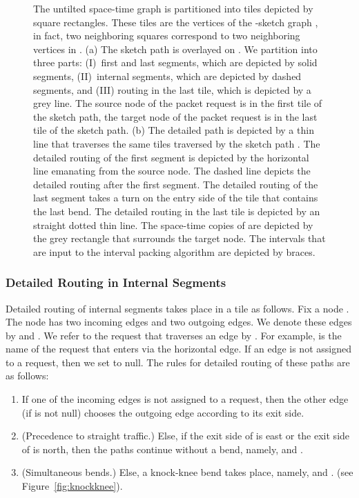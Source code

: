 \documentclass[11pt]{article}
\newenvironment{proof sketch}[1]{\noindent {\emph{Proof sketch of #1:}}}{\hfill \qed}
\begin{document}
\begin{figure}
  \centering
  \qquad
  \caption{The untilted space-time graph  is partitioned into tiles depicted by square rectangles. These tiles are the vertices of the -sketch graph , in fact, two neighboring squares correspond to two neighboring vertices in . (a) The sketch path  is overlayed on . We partition  into three parts: (I)~first and last segments, which are depicted by solid segments, (II)~internal segments, which are depicted by dashed segments, and (III) routing in the last tile, which is depicted by a grey line. The source node of the packet request is in the first tile of the sketch path, the target node of the packet request is in the last tile of the sketch path. (b) The detailed path  is depicted by a thin line that traverses the same tiles traversed by the sketch path . The detailed routing  of the first segment is depicted by the horizontal line emanating from the source  node. The dashed line depicts the detailed routing after the first segment. The detailed routing of the last segment takes a turn on the entry side of the tile that contains the last bend. The detailed routing in the last tile is depicted by an straight dotted thin line.  The space-time copies of  are depicted by the grey rectangle that surrounds the target node.
  The intervals that are input to the interval packing algorithm are depicted by braces.}
  \label{fig:ddetail}
\end{figure}

\subsubsection{Detailed Routing in Internal Segments}\label{sec:detailed internal}
Detailed routing of internal segments takes place in a tile as follows. Fix a node
. The node  has two incoming edges and two outgoing edges. We denote these
edges by  and .  We refer to the
request that traverses an edge  by .  For example,  is the name
of the request that enters  via the horizontal edge. If an edge  is not
assigned to a request, then we set  to null. The rules for detailed routing of
these paths are as follows:
\begin{enumerate}
\item If one of the incoming edges  is not assigned to a request, then the other
  edge  (if  is not null) chooses the outgoing edge according to its
  exit side.
\item (Precedence to straight traffic.) Else, if the exit side of  is east or the
  exit side of  is north, then the paths continue without a bend,
  namely,  and .
\item (Simultaneous bends.) Else, a knock-knee bend takes place, namely,
   and . (see
  Figure~\ref{fig:knockknee}).
\end{enumerate}
\end{document}
